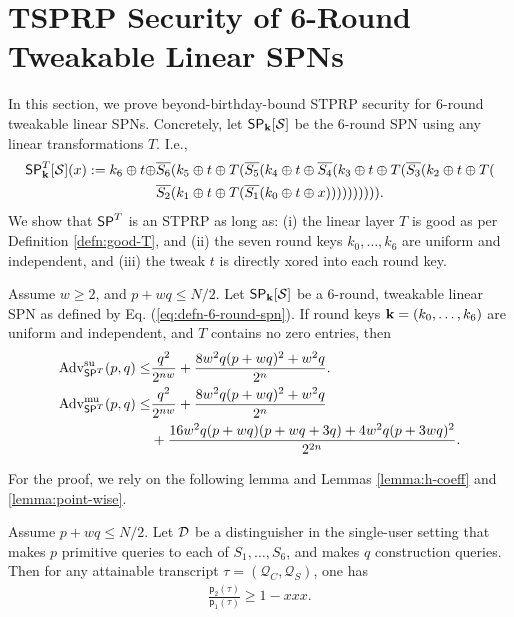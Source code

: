 

\section{TSPRP Security of 6-Round Tweakable Linear SPNs}
\label{section:beyond birthday bound for tweakable linear SPNs}

In this section, we prove beyond-birthday-bound STPRP security for 6-round tweakable linear SPNs. Concretely, let $\mathsf{SP}_{\mathbf{k}}[\mathcal{S}]$ be the 6-round SPN using any linear transformations $T$. I.e.,
%
\begin{align}
\mathsf{SP}_{\mathbf{k}}^T[\mathcal{S}](x):=k_6\oplus t\oplus&\overline{S_6}(k_5\oplus t\oplus  T(\overline{S_5}(k_4\oplus t\oplus\overline{S_4}(k_3\oplus t\oplus T(\overline{S_3}(k_2\oplus t\oplus T(    \notag    \\
&  \overline{S_2}(k_1\oplus t\oplus T(\overline{S_1}(k_0\oplus t\oplus x)))))))))).
\label{eq:defn-6-round-spn}
\end{align}
%
We show that $\mathsf{SP}^T$ is an STPRP as long as: (i) the linear layer $T$ is good as per Definition \ref{defn:good-T}, and (ii) the seven round keys $k_0,\ldots,k_6$ are uniform and independent, and (iii) the tweak $t$ is directly xored into each round key.


\begin{theorem}
\label{theorem:6-rounds}

Assume $w\geq2$, and $p+wq\leq N/2$. Let $\mathsf{SP}_{\mathbf{k}}[\mathcal{S}]$ be a 6-round, tweakable linear SPN as defined by Eq. (\ref{eq:defn-6-round-spn}). If round keys $\mathbf{k}=(k_0,\ldots,k_6)$ are uniform and independent, and $T$ contains no zero entries, then
%
\begin{align}
\operatorname{Adv}_{\mathsf{SP}^T}^{\mathrm{su}}(p, q) \leq& \frac{q^2}{2^{n w}} + \frac{8 w^2 q(p+wq)^2+w^2 q}{2^n}   .  
\notag   \\
\operatorname{Adv}_{\mathsf{SP}^T}^{\mathrm{mu}}(p, q) \leq& \frac{q^2}{2^{n w}} + \frac{8 w^2 q(p+wq)^2+w^2 q}{2^n}    \notag   \\
&+ \frac{16 w^2 q(p+w q)(p+w q +3 q)+4 w^2 q(p+3 wq)^2}{2^{2 n}}.
\notag
\end{align}
\end{theorem}

For the proof, we rely on the following lemma and Lemmas \ref{lemma:h-coeff} and \ref{lemma:point-wise}.


\begin{lemma}
	\label{lemma:proximity-6-round}
	
	Assume $p+wq\leq N/2$. Let $\mathcal{D}$ be a distinguisher in the single-user setting that makes $p$ primitive queries to each of $S_1,\ldots,S_6$, and makes $q$ construction queries. Then for any attainable
	transcript $\tau=(\mathcal{Q}_C,\mathcal{Q}_S)$, one has
	\begin{align}
	\frac{\mathsf{p}_{2}(\tau)}{\mathsf{p}_{1}(\tau)}
	\geq 1 - xxx.
	\label{eq:bound-proximity-6-round}
	\end{align}
\end{lemma}



